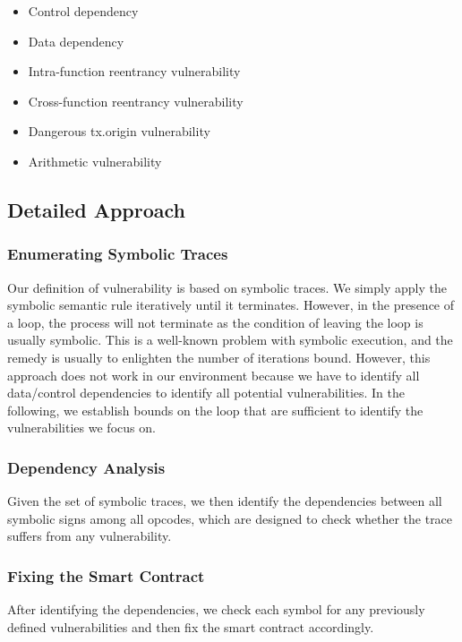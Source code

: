\documentclass[a4paper, 10pt, conference, twocolumn]{ieeeconf}       %
\begin{document}
\begin{itemize}
    \item Control dependency
    \item Data dependency
    \item Intra-function reentrancy vulnerability
    \item Cross-function reentrancy vulnerability
    \item Dangerous tx.origin vulnerability
    \item Arithmetic vulnerability
\end{itemize}

\subsection{Detailed Approach}

\subsubsection{Enumerating Symbolic Traces}

Our definition of vulnerability is based on symbolic traces.
We simply apply the symbolic semantic rule iteratively until it terminates.
However, in the presence of a loop, the process will not terminate as the condition of leaving the loop is usually symbolic.
This is a well-known problem with symbolic execution, and the remedy is usually to enlighten the number of iterations bound.
However, this approach does not work in our environment because we have to identify all data/control dependencies to identify all potential vulnerabilities.
In the following, we establish bounds on the loop that are sufficient to identify the vulnerabilities we focus on.

\subsubsection{Dependency Analysis}

Given the set of symbolic traces, we then identify the dependencies between all symbolic signs among all opcodes, which are designed to check whether the trace suffers from any vulnerability.

\subsubsection{Fixing the Smart Contract}

After identifying the dependencies, we check each symbol for any previously defined vulnerabilities and then fix the smart contract accordingly.
\end{document}
